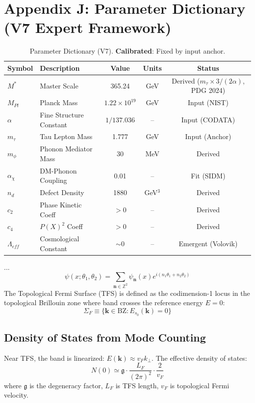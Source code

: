 \documentclass[a4paper,12pt]{article}
\begin{document}
\section{Appendix J: Parameter Dictionary (V7 Expert Framework)}
\begin{table}[H]
\centering
\small
\begin{tabular}{llccc}
\toprule
\textbf{Symbol} & \textbf{Description} & \textbf{Value} & \textbf{Units} & \textbf{Status} \\
\midrule
$M^*$ & Master Scale & 365.24 & GeV & Derived ($m_\tau \times 3/(2\alpha)$, PDG 2024) \\
$M_{Pl}$ & Planck Mass & $1.22 \times 10^{19}$ & GeV & Input (NIST) \\
$\alpha$ & Fine Structure Constant & $1/137.036$ & -- & Input (CODATA) \\
$m_\tau$ & Tau Lepton Mass & 1.777 & GeV & Input (Anchor) \\
$m_\phi$ & Phonon Mediator Mass & 30 & MeV & Derived \\
$\alpha_\chi$ & DM-Phonon Coupling & 0.01 & -- & Fit (SIDM) \\
$n_d$ & Defect Density & 1880 & GeV$^3$ & Derived \\
$c_2$ & Phase Kinetic Coeff & $> 0$ & -- & Derived \\
$c_4$ & $P(X)^2$ Coeff & $> 0$ & -- & Derived \\
$\Lambda_{eff}$ & Cosmological Constant & $\sim 0$ & -- & Emergent (Volovik) \\
\bottomrule
\end{tabular}
\caption{Parameter Dictionary (V7). \textbf{Calibrated}: Fixed by input anchor.}
\end{table}
...
\begin{equation}
 \psi(x; \theta_1, \theta_2) = \sum_{\mathbf{n} \in \mathbb{Z}^2} \psi_{\mathbf{n}}(x) e^{i(n_1\theta_1 + n_2\theta_2)}
\end{equation}
The Topological Fermi Surface (TFS) is defined as the codimension-1 locus in the topological Brillouin zone where band crosses the reference energy $E=0$:
\begin{equation}
 \Sigma_F \equiv \{ \mathbf{k} \in \text{BZ} : E_{s_0}(\mathbf{k}) = 0 \}
\end{equation}

\subsection{Density of States from Mode Counting}
Near TFS, the band is linearized: $E(\mathbf{k}) \approx v_F k_\perp$. The effective density of states:
\begin{equation}
 N(0) \simeq \mathfrak{g} \cdot \frac{L_F}{(2\pi)^2} \cdot \frac{2}{v_F}
\end{equation}
where $\mathfrak{g}$ is the degeneracy factor, $L_F$ is TFS length, $v_F$ is topological Fermi velocity.
\end{document}
